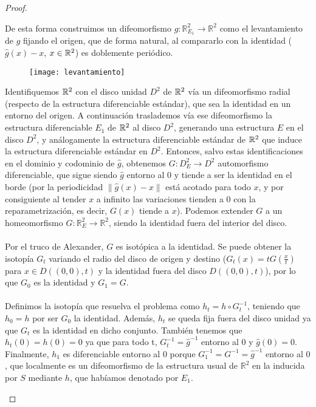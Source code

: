 \begin{proof}
\begin{enumerate}
			De esta forma construimos un difeomorfismo $\widehat{g}:\mathbb{R}^2_{E_1} \rightarrow \mathbb{R}^2$ como el levantamiento de $g$ fijando el origen, que de forma natural, al compararlo con la identidad ($\widehat{g}(x) - x$, $x \in \mathbb{R}^2$) es doblemente periódico.\\
			
			\begin{figure}[h]
  				\centering
  				\texttt{[image: levantamiento]}
  				\label{fig:levantamiento}
			\end{figure}
			
			Identifiquemos $\mathbb{R}^2$ con el disco unidad $D^2$ de $\mathbb{R}^2$ vía un difeomorfismo radial (respecto de la estructura diferenciable estándar), que sea la identidad en un entorno del origen. A continuación traslademos vía ese difeomorfismo la estructura diferenciable $E_1$ de $\mathbb{R}^2$ al disco $D^2$, generando una estructura $E$ en el disco $D^2$, y análogamente la estructura diferenciable estándar de $\mathbb{R}^2$ que induce la estructura diferenciable estándar en $D^2$. Entonces, salvo estas identificaciones en el dominio y codominio de $\widehat{g}$, obtenemos $G:D^2_{E} \rightarrow D^2$ automorfismo diferenciable, que sigue siendo $\widehat{g}$ entorno al $0$ y tiende a ser la identidad en el borde (por la periodicidad $\|\widehat{g}(x) - x\|$ está acotado para todo $x$, y por consiguiente al tender $x$ a infinito las variaciones tienden a $0$ con la reparametrización, es decir, $G(x)$ tiende a $x$). Podemos extender $G$ a un homeomorfismo $G:\mathbb{R}^2_{E} \rightarrow \mathbb{R}^2$, siendo la identidad fuera del interior del disco.\\
			\\ Por el truco de Alexander, $G$ es isotópica a la identidad. Se puede obtener la isotopía $G_t$ variando el radio del disco de origen y destino ($G_t(x) = tG(\frac{x}{t})$ para $x \in D((0,0), t)$ y la identidad fuera del disco $D((0,0), t)$), por lo que $G_0$ es la identidad y $G_1=G$.\\
			\\ Definimos la isotopía que resuelva el problema como $h_t=h\circ G_t^{-1}$, teniendo que $h_0=h$ por ser $G_0$ la identidad. Además, $h_t$ se queda fija fuera del disco unidad ya que $G_t$ es la identidad en dicho conjunto. También tenemos que $h_t(0)=h(0)=0$ ya que para todo t, $G_t^{-1} = \widehat{g}^{-1}$ entorno al $0$ y $\widehat{g}(0)=0$. Finalmente, $h_1$ es diferenciable entorno al $0$ porque $G_1^{-1}=G^{-1} = \widehat{g}^{-1}$ entorno al $0$, que localmente es un difeomorfismo de la estructura usual de $\mathbb{R}^2$ en la inducida por $S$ mediante $h$, que habíamos denotado por $E_1$.

\end{enumerate}
\end{proof}
